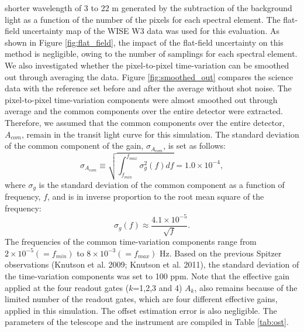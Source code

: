 \documentclass{aastex62}
\begin{document}
shorter wavelength of 3 to 22 \textmu m generated by the subtraction of the background light as a function of the number of the pixels for each spectral element. The flat-field uncertainty map of the WISE W3 data was used for this evaluation. As shown in Figure \ref{fig:flat_field}, the impact of the flat-field uncertainty on this method is negligible, owing to the number of samplings for each spectral element. We also investigated whether the pixel-to-pixel time-variation can be smoothed out through averaging the data. Figure \ref{fig:smoothed_out} compares the science data with the reference set before and after the average without shot noise. The pixel-to-pixel time-variation components were almost smoothed out through average and the common components over the entire detector were extracted. Therefore, we assumed that the common components over the entire detector, $A_{com}$, remain in the transit light curve for this simulation. The standard deviation of the common component of the gain, $\sigma_{A_{com}}$, is set as follows:
\begin{equation}
\sigma_{A_{com}} \equiv \sqrt{\int_{f_{min}}^{f_{max}} \sigma^2_{g}(f) df}=1.0\times10^{-4} ,
\end{equation}
where $\sigma_{g}$ is the standard deviation of the common component as a function of frequency, $f$, and is in inverse proportion to the root mean square of the frequency:
\begin{equation}
\sigma_{g}(f) \approx \frac{4.1\times10^{-5}}{\sqrt{f}} .
\end{equation}
The frequencies of the common time-variation components range from $2\times10^{-5} (=f_{min})$ to $8\times10^{-3} (=f_{max})$ Hz. Based on the previous Spitzer observations (Knutson et al. 2009; Knutson et al. 2011), the standard deviation of the time-variation components was set to 100 ppm. Note that the effective gain applied at the four readout gates ($k$=1,2,3 and 4) $A_{k}$, also remains because of the limited number of the readout gates, which are four different effective gains, applied in this simulation. The offset estimation error is also negligible. The parameters of the telescope and the instrument are compiled in Table \ref{tab:ost}.
\end{document}
